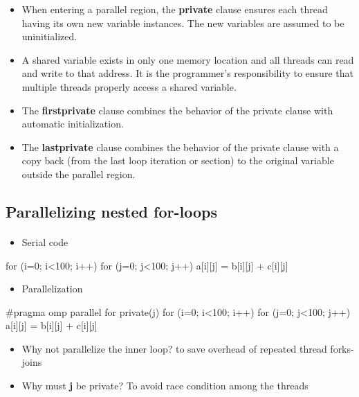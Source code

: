 \documentclass[%
oneside,                 %
final,                   %
10pt]{article}
\begin{document}
\begin{itemize}
\item When entering a parallel region, the \textbf{private} clause ensures each thread having its own new variable instances. The new variables are assumed to be uninitialized.

\item A shared variable exists in only one memory location and all threads can read and write to that address. It is the programmer's responsibility to ensure that multiple threads properly access a shared variable.

\item The \textbf{firstprivate} clause combines the behavior of the private clause with automatic initialization.

\item The \textbf{lastprivate} clause combines the behavior of the private clause with a copy back (from the last loop iteration or section) to the original variable outside the parallel region.
\end{itemize}

\noindent




\subsection{Parallelizing nested for-loops}

\paragraph{}

\begin{itemize}
 \item Serial code
\end{itemize}

\noindent
\bcppcod
for (i=0; i<100; i++)
for (j=0; j<100; j++)
a[i][j] = b[i][j] + c[i][j]
\ecppcod

\begin{itemize}
\item Parallelization
\end{itemize}

\noindent
\bcppcod
#pragma omp parallel for private(j)
for (i=0; i<100; i++)
for (j=0; j<100; j++)
a[i][j] = b[i][j] + c[i][j]
\ecppcod

\begin{itemize}
\item Why not parallelize the inner loop? to save overhead of repeated thread forks-joins

\item Why must \textbf{j} be private? To avoid race condition among the threads
\end{itemize}
\end{document}
